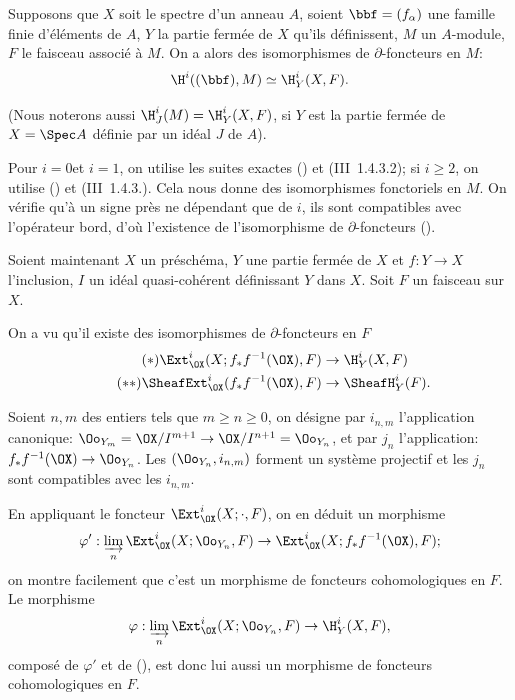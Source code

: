 \begin{supproposition} \label{II.5}
Supposons que $X$ soit le spectre d'un anneau $A$, soient $\bbf=(f_{\alpha})$ une famille finie d'\'el\'ements de $A$, $Y$ la partie ferm\'ee de $X$ qu'ils d\'efinissent, $M$ un $A$-module, $F$ le faisceau associ\'e \`a $M$. On a alors des isomorphismes de $\partial$-foncteurs en $M$:
\begin{equation} \label{eq:II.5.1} \H^i((\bbf), M) \simeq \H_Y^i(X, F).
\end{equation}
\end{supproposition}

\noindent
(Nous noterons aussi $\H_J^i(M)=\H_Y^i(X, F)$, si $Y$ est la partie ferm\'ee de $X=\Spec A$ d\'efinie par un id\'eal $J$ de $A$).

Pour $i=0$\pageoriginale et $i=1$, on utilise les suites exactes () et (\EGA III~1.4.3.2); si $i\geq2$, on utilise () et (\EGA III~1.4.3.). Cela nous donne des isomorphismes fonctoriels en $M$. On v\'erifie qu'\`a un signe pr\`es ne d\'ependant que de $i$, ils sont compatibles avec l'op\'erateur bord, d'o\`u l'existence de l'isomorphisme de $\partial$-foncteurs ().

Soient maintenant $X$ un pr\'esch\'ema, $Y$ une partie ferm\'ee de $X$ et $f:Y\to X$ l'inclusion, $I$ un id\'eal quasi-coh\'erent d\'efinissant $Y$ dans $X$. Soit $F$ un faisceau sur $X$.

On a vu qu'il existe des isomorphismes de $\partial$-foncteurs en $F$
\begin{align}
\label{eq:II.5.*} \tag{$*$} \Ext_{\OX}^i(X;f_{*}f^{-1}(\OX), F) &\to \H_Y^i(X, F) \\
\label{eq:II.5.**} \tag{$**$} \SheafExt_{\OX}^i(f_{*}f^{-1}(\OX), F) &\to \SheafH_Y^i(F).
\end{align}

Soient $n, m$ des entiers tels que $m\geq n\geq 0$, on d\'esigne par $i_{n, m}$ l'application canonique: $\Oo_{Y_m}=\OX/I^{m+1} \to\OX/I^{n+1}=\Oo_{Y_n}$, et par $j_n$ l'application: $f_{*}f^{-1}(\OX)\to\Oo_{Y_n}$. Les $(\Oo_{Y_n}, i_{n, m})$ forment un syst\`eme projectif et les $j_n$ sont compatibles avec les $i_{n, m}$.

En appliquant le foncteur $\Ext_{\OX}^i(X;\cdot, F)$, on en d\'eduit un morphisme
$$
\varphi': \varinjlim_{n} \Ext_{\OX}^i(X;\Oo_{Y_n}, F) \to \Ext_{\OX}^i(X;f_{*}f^{-1}(\OX), F);
$$
on montre facilement que c'est un morphisme de foncteurs cohomologiques en $F$. Le morphisme
$$
\varphi: \varinjlim_{n} \Ext_{\OX}^i(X;\Oo_{Y_n}, F) \to \H_Y^i(X, F),
$$
compos\'e de $\varphi'$ et de (), est donc lui aussi un morphisme de foncteurs cohomologiques en $F$.

